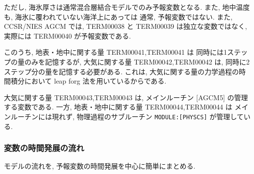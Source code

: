ただし, 海氷厚さは通常混合層結合モデルでのみ予報変数となる.
また, 地中温度も, 海氷に覆われていない海洋上にあっては
通常, 予報変数ではない.
また, CCSR/NIES AGCM では, TERM00038 と TERM00039 は独立な変数ではなく,
実際には TERM00040 が予報変数である.

このうち,
地表・地中に関する量 TERM00041,TERM00041 は
同時には1ステップの量のみを記憶するが,
大気に関する量 TERM00042,TERM00042 は, 
同時に2ステップ分の量を記憶する必要がある.
これは, 大気に関する量の力学過程の時間積分において
leap forg 法を用いているからである.

大気に関する量 TERM00043,TERM00043 は,
メインルーチン [AGCM5] の管理する変数である.
一方, 地表・地中に関する量 TERM00044,TERM00044 は
メインルーチンには現れず, 
物理過程のサブルーチン \texttt{MODULE:[PHYSCS]} が管理している.

\subsubsection{変数の時間発展の流れ}

モデルの流れを, 予報変数の時間発展を中心に簡単にまとめる.

